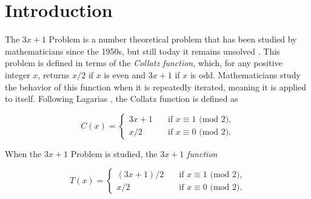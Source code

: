 \documentclass[12pt,a4paper,reqno]{amsart}
\begin{document}
\tableofcontents


\thispagestyle{empty}
\pagestyle{fancy}
\renewcommand{\headrulewidth}{0pt}

\fancyhead{}


\section{Introduction}

The $3x+1$ Problem is a number theoretical problem that has been studied by 
mathematicians since the 1950s, but still
today it remains unsolved \cite{src:03}. This problem is defined in terms of
the \textit{Collatz function}, which, for any positive integer $x$, returns
$x/2$ if $x$ is even and $3x+1$ if $x$ is odd. Mathematicians study the
behavior of this function when it is repeatedly iterated, meaning it is applied
to itself. Following Lagarias \cite{src:03}, the Collatz function is defined as 

\begin{equation}
C(x)= \left\{
    \begin{array}{ll}
        3x+1 \quad &\text{if } x \equiv 1 \text{ (mod 2),} \\
        x/2 \quad &\text{if } x \equiv 0 \text{ (mod 2).}
    \end{array}
\right.
\label{eq:01}
\end{equation}

When the $3x+1$ Problem is studied, the \textit{$3x+1$ function} 

\begin{equation}
T(x)= \left\{
    \begin{array}{ll}
        (3x+1)/2 \quad &\text{if } x \equiv 1 \text{ (mod 2),} \\
        x/2 \quad &\text{if } x \equiv 0 \text{ (mod 2)}.
    \end{array}
\right.
\label{eq:02}
\end{equation}
\end{document}
